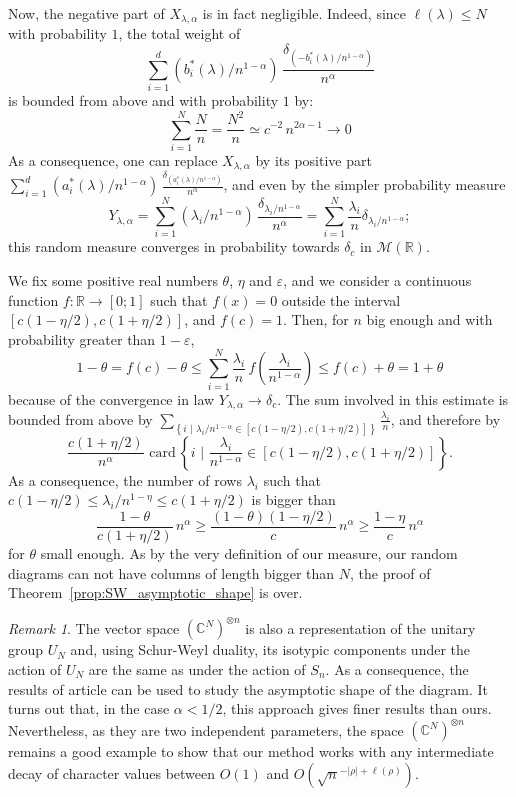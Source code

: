 \documentclass[10pt]{amsart}
\theoremstyle{remark}
\newtheorem{remark}{Remark}
\newcommand{\R}{\mathbb{R}}
\newcommand{\C}{\mathbb{C}}
\newcommand{\card}{\mathrm{card}\,}
\newcommand{\eps}{\varepsilon}
\begin{document}
Now, the negative part of $X_{\lambda,\alpha}$ is in fact negligible. Indeed, since $\ell(\lambda)\leq N$ with probability $1$, the total weight of 
$$\sum_{i=1}^{d} (b_{i}^{*}(\lambda)/n^{1-\alpha})\,\frac{\delta_{(-b_{i}^{*}(\lambda)/n^{1-\alpha})}}{n^{\alpha}}$$
is bounded from above and with probability $1$ by:
$$\sum_{i=1}^{N}\frac{N}{n} = \frac{N^{2}}{n}\simeq c^{-2}\,n^{2\alpha-1}\to 0$$
As a consequence, one can replace $X_{\lambda,\alpha}$ by its positive part $\sum_{i=1}^{d}(a_{i}^{*}(\lambda)/n^{1-\alpha})\,\frac{\delta_{(a_{i}^{*}(\lambda)/n^{1-\alpha})}}{n^{\alpha}}$, and even by the simpler probability measure 
$$Y_{\lambda,\alpha}=\sum_{i=1}^{N} (\lambda_{i}/n^{1-\alpha})\,\frac{\delta_{\lambda_{i}/n^{1-\alpha}}}{n^{\alpha}}=\sum_{i=1}^{N} \frac{\lambda_{i}}{n}\delta_{\lambda_{i}/n^{1-\alpha}};$$
this random measure converges in probability towards $\delta_{c}$ in $\mathscr{M}(\R)$.\bigskip

We fix some positive real numbers $\theta$, $\eta$ and $\eps$, and we consider a continuous function $f:\R \to [0;1]$ such that $f(x)=0$ outside the interval $[c(1-\eta/2),c(1+\eta/2)]$, and $f(c)=1$. Then, for $n$ big enough and with probability greater than $1-\eps$,
$$1-\theta=f(c)-\theta \leq \sum_{i=1}^{N} \frac{\lambda_{i}}{n}\,f\left(\frac{\lambda_{i}}{n^{1-\alpha}} \right) \leq f(c)+\theta=1+\theta$$
because of the convergence in law $Y_{\lambda,\alpha}\to \delta_{c}$. The sum involved in this estimate is bounded from above by $\sum_{\left\{i\,\,|\,\,\lambda_{i}/n^{1-\alpha} \in [c(1-\eta/2),c(1+\eta/2)]\right\}}\frac{\lambda_{i}}{n}$, and therefore by
$$\frac{c(1+\eta/2)}{n^{\alpha}}\,\,\card\left\{i\,\,\bigg|\,\,\frac{\lambda_{i}}{n^{1-\alpha}} \in [c(1-\eta/2),c(1+\eta/2)]\right\}.$$
As a consequence, the number of rows $\lambda_{i}$ such that $c(1-\eta/2)\leq \lambda_{i}/n^{1-\eta} \leq c(1+\eta/2)$ is bigger than 
$$\frac{1-\theta}{c(1+\eta/2)} \,n^{\alpha}\geq \frac{(1-\theta)(1-\eta/2)}{c}\,n^{\alpha}\geq \frac{1-\eta}{c}\,n^{\alpha}$$
for $\theta$ small enough.
As by the very definition of our measure, our random diagrams can not have
columns of length bigger than $N$, the proof of Theorem~\ref{prop:SW_asymptotic_shape} is over.

\begin{remark}
The vector space $(\C^N)^{\otimes n}$ is also a representation of the unitary group $U_N$ and, using Schur-Weyl duality, its isotypic components under the action of $U_N$ are the same as under the action of $S_n$. As a consequence, the results of article \cite{CollinsSniady09} can be used to study the asymptotic shape of the diagram. It turns out that, in the case $\alpha <1/2$, this approach gives finer results than ours. Nevertheless, as they are two independent parameters, the space $(\C^N)^{\otimes n}$ remains a good example to show that our method works with any intermediate decay of character values between $O(1)$ and $O(\sqrt{n}^{-|\rho|+\ell(\rho)})$.
\end{remark}
\end{document}
